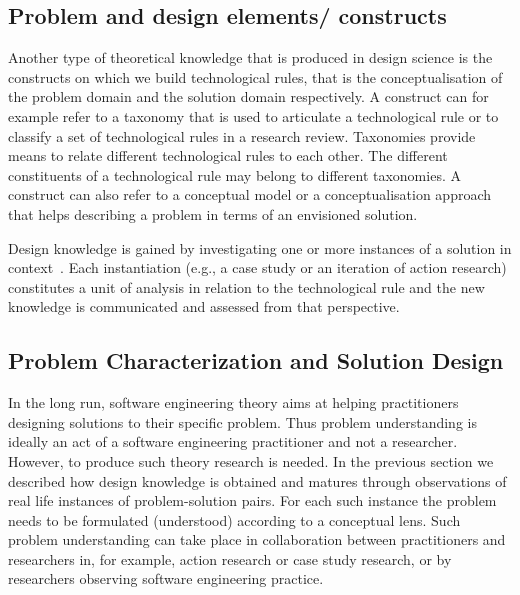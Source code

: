 \documentclass[graybox]{svmult}
\begin{document}
\subsection{Problem and design elements/ constructs}
\label{sec:constructs}
Another type of theoretical knowledge that is produced in design science is the 
constructs on which we build technological rules, that is the conceptualisation of the problem domain and the solution domain respectively.  
A construct can for example refer to a taxonomy that is used to articulate a technological rule or to classify a set of technological rules in a research review. Taxonomies provide means to relate different technological rules to each other. The different constituents of a technological rule may belong to different taxonomies. A construct can also refer to a conceptual model or a conceptualisation approach that helps describing a problem in terms of an envisioned solution.

Design knowledge is gained by investigating one or more instances of a solution in context~\cite{wieringa_what_2014}. Each instantiation (e.g., a case study or an iteration of action research) constitutes a unit of analysis in relation to the technological rule and the new knowledge is communicated and assessed from that perspective. 



\subsection{Problem Characterization and Solution Design}



In the long run, software engineering theory aims at helping practitioners designing solutions to their specific problem. Thus problem understanding is ideally an act of a software engineering practitioner and not a researcher. However, to produce such theory research is needed. In the previous section we described how design knowledge is obtained and matures through observations of real life instances of problem-solution pairs. For each such instance the problem needs to be formulated (understood) according to a conceptual lens. Such problem understanding can take place in collaboration between practitioners and researchers in, for example, action research or case study research, or by researchers observing software engineering practice.
\end{document}
